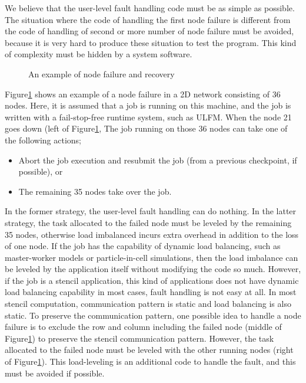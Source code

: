 \documentclass[10pt,conference,a4paper,fleqn]{IEEEtran}
\begin{document}
We believe that the user-level fault handling code must be as simple
as possible. The situation where the code of handling the first
node failure is different from the code of handling of second or more
number of node failure must be avoided, because it is very hard to
produce these situation to test the program. This kind of complexity
must be hidden by a system software.

\begin{figure}[ht]
\begin{center}
  \caption{An example of node failure and recovery} 
  \label{fig:node-failure}
\end{center}
\end{figure}

Figure\ref{fig:node-failure} shows an example of a node failure in a
2D network consisting of 36 nodes. Here, it is assumed that a job is
running on this machine, and the job is written with a fail-stop-free
runtime system, such as ULFM. When the node 21 goes down (left of
Figure\ref{fig:node-failure}, The job running on those 36 nodes can
take one of the following actions; 

\begin{itemize}
\item Abort the job execution and resubmit the job (from a previous
  checkpoint, if possible), or
\item The remaining 35 nodes take over the job.
\end{itemize}

In the former strategy, the user-level fault handling can do nothing. 
In the latter strategy, the task allocated to the failed node must
be leveled by the remaining 35 nodes, otherwise load imbalanced incurs
extra overhead in addition to the loss of one node. If the job has the
capability of dynamic load balancing, such as master-worker models or
particle-in-cell simulations, then the load imbalance can be leveled by
the application itself without modifying the code so much. However, if
the job is a stencil application, this kind of applications does not
have dynamic load balancing capability in most cases, fault handling
is not easy at all. In most stencil computation, communication pattern
is static and load balancing is also static. To preserve the
communication pattern, one possible idea to handle a node failure is
to exclude the row and column including the failed node (middle of
Figure\ref{fig:node-failure}) to preserve the stencil communication
pattern. However, the task allocated to the 
failed node must be leveled with the other running nodes (right of
Figure\ref{fig:node-failure}). This load-leveling is an additional
code to handle the fault, and this must be avoided if possible.
\end{document}
